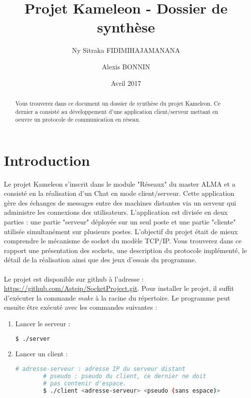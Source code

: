 \documentclass[11pt]{article}
\title{Projet Kameleon - Dossier de synthèse}
\author{Ny Sitraka FIDIMIHAJAMANANA \and Alexis BONNIN}
\date{Avril 2017}
\begin{document}
\maketitle
\begin{abstract}
    Vous trouverez dans ce document un dossier de synthèse du projet Kameleon. Ce dernier a consisté au développement d'une application client/serveur mettant en oeuvre un protocole de communication en réseau.
\end{abstract}
\tableofcontents
\newpage

\section{Introduction}
    
    \paragraph{}
    Le projet Kameleon s'inscrit dans le module "Réseaux" du master ALMA et a consisté en la réalisation d'un Chat en mode client/serveur. Cette application gère des échanges de messages entre des machines distantes via un serveur qui administre les connexions des utilisateurs. L'application est divisée en deux parties : une partie "serveur" déployée sur un seul poste et une partie "cliente" utilisée simultanément sur plusieurs postes. L'objectif du projet était de mieux comprendre le mécanisme de socket du modèle TCP/IP. Vous trouverez dans ce rapport une présentation des sockets, une description du protocole implémenté, le détail de la réalisation ainsi que des jeux d'essais du programme.

    \paragraph{}
    Le projet est disponible sur github à l'adresse : \url{https://github.com/Asteip/SocketProject.git}. Pour installer le projet, il suffit d'exécuter la commande \textit{make} à la racine du répertoire. Le programme peut ensuite être exécuté avec les commandes suivantes :
    
    \begin{enumerate}
        \item Lancer le serveur :
        \begin{lstlisting}[language=bash,captionpos=b]
        $ ./server
        \end{lstlisting}
        
        \item Lancer un client :
        \begin{lstlisting}[language=bash,captionpos=b]
        # adresse-serveur : adresse IP du serveur distant
        # pseudo : pseudo du client, ce dernier ne doit 
        # pas contenir d'espace.
        $ ./client <adresse-serveur> <pseudo (sans espace)>
        \end{lstlisting}
    \end{enumerate}
    
\end{document}
